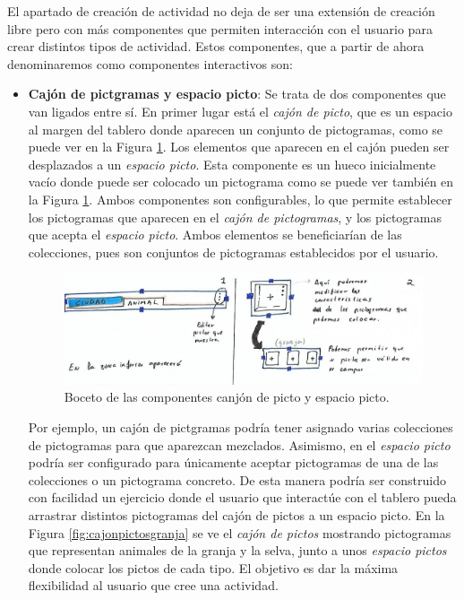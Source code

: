 El apartado de  creación de actividad no deja de ser una extensión de creación libre pero con más  componentes que permiten interacción con el usuario para crear distintos tipos de actividad. Estos componentes, que a partir de ahora denominaremos como componentes interactivos son:

\begin{itemize}
	
	\item \textbf{Cajón de pictgramas y espacio picto}: Se trata de dos componentes que van ligados entre sí. En primer lugar está el \textit{cajón de picto}, que es un espacio al margen del tablero donde aparecen un conjunto de pictogramas, como se puede ver en la Figura \ref{fig:componentecajon}. Los elementos que aparecen en el cajón pueden  ser desplazados a un \textit{espacio picto}. Esta componente es un hueco inicialmente vacío donde puede ser colocado un pictograma como se puede ver también en la Figura \ref{fig:componentecajon}. Ambos componentes son configurables, lo que permite establecer los pictogramas que aparecen en el \textit{cajón de pictogramas}, y los pictogramas que acepta el \textit{espacio picto}. Ambos elementos se beneficiarían de las colecciones, pues son conjuntos de pictogramas establecidos por el usuario.
	
	\begin{figure}[h!]
		\centering
		\includegraphics[width=0.7\linewidth]{Imagenes/Bitmap/componenteCajon}
		\caption{Boceto de las componentes canjón de picto y espacio picto.}
		\label{fig:componentecajon}
	\end{figure}
	
	
	Por ejemplo, un cajón de pictgramas podría tener asignado varias colecciones de pictogramas para que aparezcan mezclados. Asimismo, en el \textit{espacio picto} podría ser configurado para únicamente aceptar pictogramas de una de las colecciones o un pictograma concreto. De esta manera podría ser construido con facilidad un ejercicio donde el usuario que interactúe con el tablero pueda arrastrar distintos pictogramas del cajón de pictos a un espacio picto. En la Figura \ref{fig:cajonpictosgranja} se ve el \textit{cajón de pictos} mostrando pictogramas que representan animales de la granja y la selva, junto a unos \textit{espacio pictos} donde colocar los pictos de cada tipo.  El objetivo es dar la máxima flexibilidad al usuario que cree una actividad.
	

\end{itemize}
